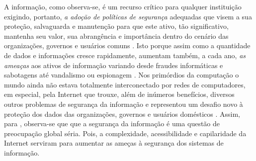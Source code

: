 A informação, como observa-se, é um recurso crítico para qualquer instituição exigindo, portanto, \textit{a adoção de políticas de segurança} adequadas que visem a sua proteção, salvaguarda e manutenção para que este ativo, tão significativo, mantenha seu valor, sua abrangência e importância dentro do cenário das organizações, governos e usuários comuns \cite{marciano_segurancda_nodate}. Isto porque assim como a quantidade de dados e informações cresce rapidamente, aumentam também, a cada ano, \textit{as ameaças} aos ativos de informação variando desde fraudes informáticas e sabotagens até vandalismo ou espionagem \cite{casaca_porque_2013}.
Nos primórdios da computação o mundo ainda não estava totalmente interconectado por redes de computadores, em especial, pela Internet que trouxe, além de inúmeros benefícios, diversos outros problemas de segurança da informação e representou um desafio novo à proteção dos dados das organizações, governos e usuários domésticos \cite{fontes_politicas}. Assim, para , observa-se que que a segurança da informação é uma questão de preocupação global séria. Pois, a complexidade, acessibilidade e capilaridade da Internet serviram para aumentar as ameças à segurança dos sistemas de informação.

